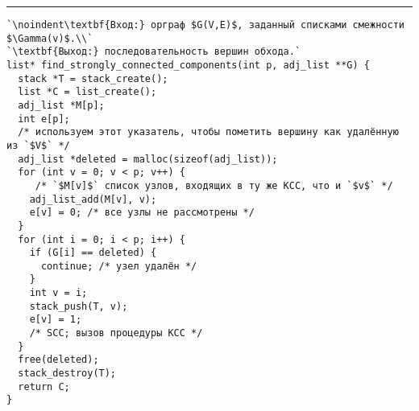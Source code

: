 \vspace{5pt} \hrule
\begin{lstlisting}[caption={Выделение компонент сильной связности}, label=p283_scc, escapechar=`]
`\noindent\textbf{Вход:} орграф $G(V,E)$, заданный списками смежности $\Gamma(v)$.\\`
`\textbf{Выход:} последовательность вершин обхода.`
list* find_strongly_connected_components(int p, adj_list **G) {
  stack *T = stack_create();
  list *C = list_create();
  adj_list *M[p];
  int e[p];
  /* используем этот указатель, чтобы пометить вершину как удалённую из `$V$` */
  adj_list *deleted = malloc(sizeof(adj_list));
  for (int v = 0; v < p; v++) {
     /* `$M[v]$` список узлов, входящих в ту же КСС, что и `$v$` */
    adj_list_add(M[v], v);
    e[v] = 0; /* все узлы не рассмотрены */
  }
  for (int i = 0; i < p; i++) {
    if (G[i] == deleted) {
      continue; /* узел удалён */
    }
    int v = i;
    stack_push(T, v);
    e[v] = 1;
    /* SCC; вызов процедуры КСС */
  }
  free(deleted);
  stack_destroy(T);
  return C;
}
\end{lstlisting}
